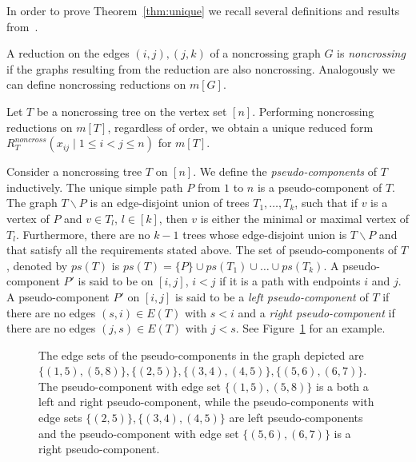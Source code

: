 \documentclass[ALCO,ThmDefs]{cedram}
\numberwithin{equation}{section}
\newcommand*\+{\smash{\lower2pt\hbox{\rlap{\vrule height14pt}}\raise2pt\hbox{\rlap{\hskip-3pt \vrule height.4pt depth0pt width14.7pt}}}}
\begin{document}
In order to prove Theorem~\ref{thm:unique} we recall several definitions and results from~\cite{root1}.

A reduction on the edges $(i,j),(j,k)$ of a noncrossing graph $G$ is \emph{noncrossing} if the graphs resulting from the reduction are also noncrossing. Analogously we can define noncrossing reductions on $m[G]$.

\begin{theo}\label{thm:noncross}
Let $T$ be a noncrossing tree on the vertex set $[n]$. Performing noncrossing reductions on $m[T]$, regardless of order, we obtain a unique reduced form $R^{noncross}_T(x_{ij} \mid 1\leq i<j\leq n)$ for $m[T]$.
\end{theo}

Consider a noncrossing tree $T$ on $[n]$. We define the \emph{pseudo-components} of $T$ inductively. The unique simple path $P$ from $1$ to $n$ is a pseudo-component of $T$. The graph $T\backslash P$ is an edge-disjoint union of trees $T_1, \dots, T_k$, such that if $v$ is a vertex of $P$ and $v \in T_l$, $l \in [k]$, then $v$ is either the minimal or maximal vertex of $T_l$. Furthermore, there are no $k-1$ trees whose edge-disjoint union is $T\backslash P$ and that satisfy all the requirements stated above. The set of pseudo-components of $T$, denoted by $ps(T)$ is $ps(T)=\{P\} \cup ps(T_1)\cup \dots \cup ps(T_k)$. A pseudo-component $P'$ is said to be on $[i, j]$, $i<j$ if it is a path with endpoints $i$ and $j$. A pseudo-component $P' $ on $[i, j]$ is said to be a \emph{left pseudo-component} of $T$ if there are no edges $(s, i) \in E(T)$ with $s<i$ and a \emph{right pseudo-component} if there are no edges $(j, s) \in E(T)$ with $j<s$. See Figure~\ref{fig:pseudo} for an example.

\begin{figure}[htbp]
\begin{center} 
\caption{The edge sets of the pseudo-components in the graph depicted are $\{(1, 5), (5, 8)\}, \{(2, 5)\}, \{(3, 4), (4, 5)\}, \{(5, 6), (6, 7)\}$. The pseudo-component with edge set $\{(1, 5), (5, 8)\}$ is a both a left and right pseudo-component, while the pseudo-components with edge sets $ \{(2, 5)\}, \{(3, 4), (4, 5)\}$ are left pseudo-components and the pseudo-component with edge set $\{(5, 6), (6, 7)\}$ is a right pseudo-component.}\label{fig:pseudo}
\end{center}
\end{figure}
\end{document}
